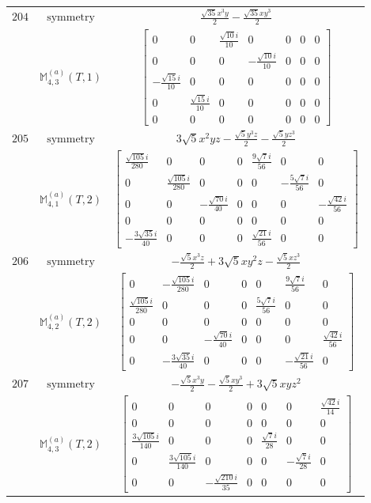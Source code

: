\documentclass[fleqn,8pt,landscape]{jsarticle}
\begin{document}
\begin{longtable}{ccc}
$ 204 $ & $ \text{symmetry} $ & $ \frac{\sqrt{35} x^{3} y}{2} - \frac{\sqrt{35} x y^{3}}{2} $ \\
$  $ & $ \mathbb{M}_{4,3}^{(a)}(T,1) $ & $ \begin{bmatrix} 0 & 0 & \frac{\sqrt{10} i}{10} & 0 & 0 & 0 & 0 \\ 0 & 0 & 0 & - \frac{\sqrt{10} i}{10} & 0 & 0 & 0 \\ - \frac{\sqrt{15} i}{10} & 0 & 0 & 0 & 0 & 0 & 0 \\ 0 & \frac{\sqrt{15} i}{10} & 0 & 0 & 0 & 0 & 0 \\ 0 & 0 & 0 & 0 & 0 & 0 & 0 \end{bmatrix} $ \\ \hline
$ 205 $ & $ \text{symmetry} $ & $ 3 \sqrt{5} x^{2} y z - \frac{\sqrt{5} y^{3} z}{2} - \frac{\sqrt{5} y z^{3}}{2} $ \\
$  $ & $ \mathbb{M}_{4,1}^{(a)}(T,2) $ & $ \begin{bmatrix} \frac{\sqrt{105} i}{280} & 0 & 0 & 0 & \frac{9 \sqrt{7} i}{56} & 0 & 0 \\ 0 & \frac{\sqrt{105} i}{280} & 0 & 0 & 0 & - \frac{5 \sqrt{7} i}{56} & 0 \\ 0 & 0 & - \frac{\sqrt{70} i}{40} & 0 & 0 & 0 & - \frac{\sqrt{42} i}{56} \\ 0 & 0 & 0 & 0 & 0 & 0 & 0 \\ - \frac{3 \sqrt{35} i}{40} & 0 & 0 & 0 & \frac{\sqrt{21} i}{56} & 0 & 0 \end{bmatrix} $ \\ \hline
$ 206 $ & $ \text{symmetry} $ & $ - \frac{\sqrt{5} x^{3} z}{2} + 3 \sqrt{5} x y^{2} z - \frac{\sqrt{5} x z^{3}}{2} $ \\
$  $ & $ \mathbb{M}_{4,2}^{(a)}(T,2) $ & $ \begin{bmatrix} 0 & - \frac{\sqrt{105} i}{280} & 0 & 0 & 0 & \frac{9 \sqrt{7} i}{56} & 0 \\ \frac{\sqrt{105} i}{280} & 0 & 0 & 0 & \frac{5 \sqrt{7} i}{56} & 0 & 0 \\ 0 & 0 & 0 & 0 & 0 & 0 & 0 \\ 0 & 0 & - \frac{\sqrt{70} i}{40} & 0 & 0 & 0 & \frac{\sqrt{42} i}{56} \\ 0 & - \frac{3 \sqrt{35} i}{40} & 0 & 0 & 0 & - \frac{\sqrt{21} i}{56} & 0 \end{bmatrix} $ \\ \hline
$ 207 $ & $ \text{symmetry} $ & $ - \frac{\sqrt{5} x^{3} y}{2} - \frac{\sqrt{5} x y^{3}}{2} + 3 \sqrt{5} x y z^{2} $ \\
$  $ & $ \mathbb{M}_{4,3}^{(a)}(T,2) $ & $ \begin{bmatrix} 0 & 0 & 0 & 0 & 0 & 0 & \frac{\sqrt{42} i}{14} \\ 0 & 0 & 0 & 0 & 0 & 0 & 0 \\ \frac{3 \sqrt{105} i}{140} & 0 & 0 & 0 & \frac{\sqrt{7} i}{28} & 0 & 0 \\ 0 & \frac{3 \sqrt{105} i}{140} & 0 & 0 & 0 & - \frac{\sqrt{7} i}{28} & 0 \\ 0 & 0 & - \frac{\sqrt{210} i}{35} & 0 & 0 & 0 & 0 \end{bmatrix} $ \\ \hline
\end{longtable}
\end{document}
